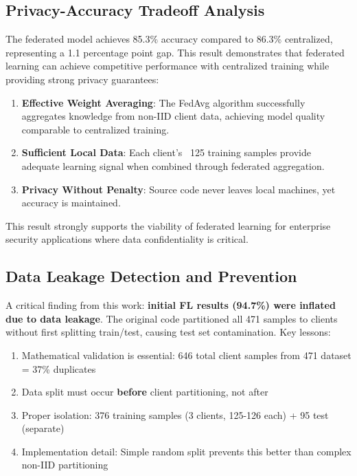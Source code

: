 \documentclass[conference]{IEEEtran}
\begin{document}
\subsection{Privacy-Accuracy Tradeoff Analysis}

The federated model achieves 85.3\% accuracy compared to 86.3\% centralized, representing a 1.1 percentage point gap. This result demonstrates that federated learning can achieve competitive performance with centralized training while providing strong privacy guarantees:

\begin{enumerate}
    \item \textbf{Effective Weight Averaging}: The FedAvg algorithm successfully aggregates knowledge from non-IID client data, achieving model quality comparable to centralized training.
    
    \item \textbf{Sufficient Local Data}: Each client's ~125 training samples provide adequate learning signal when combined through federated aggregation.
    
    \item \textbf{Privacy Without Penalty}: Source code never leaves local machines, yet accuracy is maintained.
\end{enumerate}

This result strongly supports the viability of federated learning for enterprise security applications where data confidentiality is critical.

\subsection{Data Leakage Detection and Prevention}

A critical finding from this work: \textbf{initial FL results (94.7\%) were inflated due to data leakage}. The original code partitioned all 471 samples to clients without first splitting train/test, causing test set contamination. Key lessons:

\begin{enumerate}
    \item Mathematical validation is essential: 646 total client samples from 471 dataset = 37\% duplicates
    \item Data split must occur \textbf{before} client partitioning, not after
    \item Proper isolation: 376 training samples (3 clients, 125-126 each) + 95 test (separate)
    \item Implementation detail: Simple random split prevents this better than complex non-IID partitioning
\end{enumerate}
\end{document}

